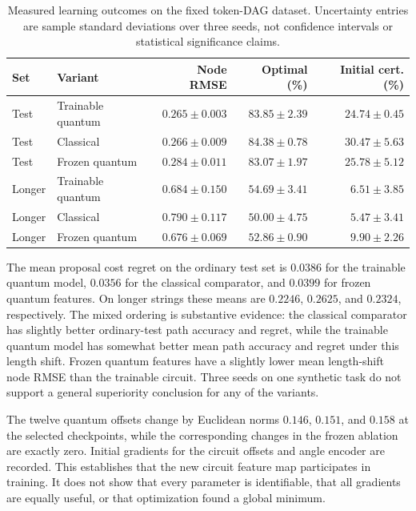 \begin{table}[htbp]
\centering\small
\begin{tabular}{llrrr}
\toprule
Set & Variant & Node RMSE & Optimal (\%) & Initial cert. (\%)\\
\midrule
Test & Trainable quantum & $0.265\pm0.003$ & $83.85\pm2.39$ & $24.74\pm0.45$\\
Test & Classical & $0.266\pm0.009$ & $84.38\pm0.78$ & $30.47\pm5.63$\\
Test & Frozen quantum & $0.284\pm0.011$ & $83.07\pm1.97$ & $25.78\pm5.12$\\
\midrule
Longer & Trainable quantum & $0.684\pm0.150$ & $54.69\pm3.41$ & $6.51\pm3.85$\\
Longer & Classical & $0.790\pm0.117$ & $50.00\pm4.75$ & $5.47\pm3.41$\\
Longer & Frozen quantum & $0.676\pm0.069$ & $52.86\pm0.90$ & $9.90\pm2.26$\\
\bottomrule
\end{tabular}
\caption{Measured learning outcomes on the fixed token-DAG dataset.
Uncertainty entries are sample standard deviations over three seeds,
not confidence intervals or statistical significance claims.}
\label{qt:benchmark}
\end{table}

The mean proposal cost regret on the ordinary test set is $0.0386$ for
the trainable quantum model, $0.0356$ for the classical comparator, and
$0.0399$ for frozen quantum features. On longer strings these means are
$0.2246$, $0.2625$, and $0.2324$, respectively. The mixed ordering is
substantive evidence: the classical comparator has slightly better
ordinary-test path accuracy and regret, while the trainable quantum model
has somewhat better mean path accuracy and regret under this length shift.
Frozen quantum features have a slightly lower mean length-shift node
RMSE than the trainable circuit. Three seeds on one synthetic task do not
support a general superiority conclusion for any of the variants.

The twelve quantum offsets change by Euclidean norms $0.146$, $0.151$,
and $0.158$ at the selected checkpoints, while the corresponding changes
in the frozen ablation are exactly zero. Initial gradients for the
circuit offsets and angle encoder are recorded. This establishes that
the new circuit feature map participates in training. It does not show
that every parameter is identifiable, that all gradients are equally
useful, or that optimization found a global minimum.

